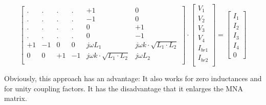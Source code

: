 \begin{equation}
\begin{bmatrix}
. & . & . & . & +1 &  0\\
. & . & . & . & -1 &  0\\
. & . & . & . &  0 & +1\\
. & . & . & . &  0 & -1\\
+1 & -1 & 0 & 0 & j\omega L_1 & j\omega k\cdot\sqrt{L_1\cdot L_2} \\
0 & 0 & +1 & -1 & j\omega k\cdot\sqrt{L_1\cdot L_2} & j\omega L_2 \\
\end{bmatrix}
\cdot
\begin{bmatrix}
V_1\\
V_2\\
V_3\\
V_4\\
I_{br1}\\
I_{br2}\\
\end{bmatrix}
=
\begin{bmatrix}
I_1\\
I_2\\
I_3\\
I_4\\
0
\end{bmatrix}
\end{equation}

Obviously, this approach has an advantage: It also works for zero
inductances and for unity coupling factors. It has the disadvantage
that it enlarges the MNA matrix.
